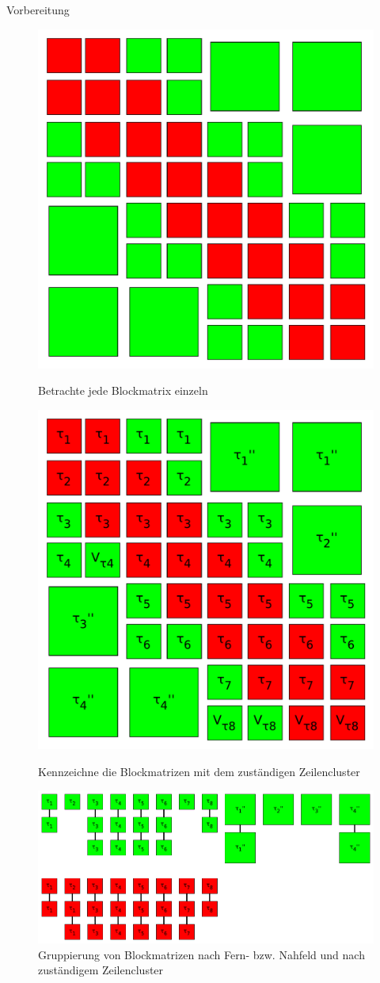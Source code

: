 \documentclass[10pt]{beamer}
\begin{document}
\begin{frame}{Vorbereitung}\vfill
  \begin{figure}
    \begin{overprint}
        \centering
        \includegraphics[width=.66\linewidth]{figures/fg-h2-matrix-block.pdf}
        \caption{Betrachte jede Blockmatrix einzeln}
        \centering
        \includegraphics[width=.66\linewidth]{figures/fg-h2-matrix-block-labled.pdf}
        \caption{Kennzeichne die Blockmatrizen mit dem zust\"andigen Zeilencluster}
        \centering
        \includegraphics[width=\linewidth]{figures/fg-h2-matrix-block-orderd.pdf}
        \caption{Gruppierung von Blockmatrizen nach Fern- bzw. Nahfeld und nach
                 zust\"andigem Zeilencluster}
    \end{overprint}
  \end{figure}
\end{frame}
\end{document}
